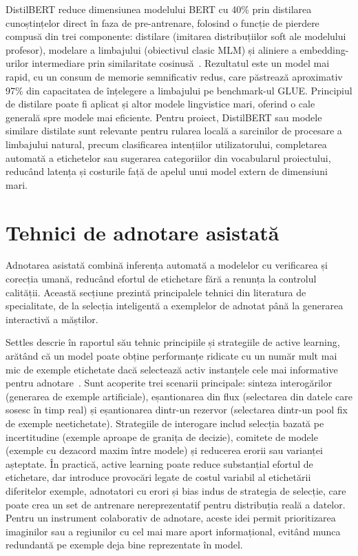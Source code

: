 DistilBERT reduce dimensiunea modelului BERT cu 40\% prin distilarea cunoștințelor direct în faza de pre-antrenare, folosind o funcție de pierdere compusă din trei componente: distilare (imitarea distribuțiilor soft ale modelului profesor), modelare a limbajului (obiectivul clasic MLM) și aliniere a embedding-urilor intermediare prin similaritate cosinusă~\cite{sanh2020distilbertdistilledversionbert}. Rezultatul este un model mai rapid, cu un consum de memorie semnificativ redus, care păstrează aproximativ 97\% din capacitatea de înțelegere a limbajului pe benchmark-ul GLUE. Principiul de distilare poate fi aplicat și altor modele lingvistice mari, oferind o cale generală spre modele mai eficiente. Pentru proiect, DistilBERT sau modele similare distilate sunt relevante pentru rularea locală a sarcinilor de procesare a limbajului natural, precum clasificarea intențiilor utilizatorului, completarea automată a etichetelor sau sugerarea categoriilor din vocabularul proiectului, reducând latența și costurile față de apelul unui model extern de dimensiuni mari.

\section{Tehnici de adnotare asistată}

Adnotarea asistată combină inferența automată a modelelor cu verificarea și corecția umană, reducând efortul de etichetare fără a renunța la controlul calității. Această secțiune prezintă principalele tehnici din literatura de specialitate, de la selecția inteligentă a exemplelor de adnotat până la generarea interactivă a măștilor.

Settles descrie în raportul său tehnic principiile și strategiile de active learning, arătând că un model poate obține performanțe ridicate cu un număr mult mai mic de exemple etichetate dacă selectează activ instanțele cele mai informative pentru adnotare~\cite{settles.tr09}. Sunt acoperite trei scenarii principale: sinteza interogărilor (generarea de exemple artificiale), eșantionarea din flux (selectarea din datele care sosesc în timp real) și eșantionarea dintr-un rezervor (selectarea dintr-un pool fix de exemple neetichetate). Strategiile de interogare includ selecția bazată pe incertitudine (exemple aproape de granița de decizie), comitete de modele (exemple cu dezacord maxim între modele) și reducerea erorii sau varianței așteptate. În practică, active learning poate reduce substanțial efortul de etichetare, dar introduce provocări legate de costul variabil al etichetării diferitelor exemple, adnotatori cu erori și bias indus de strategia de selecție, care poate crea un set de antrenare nereprezentatif pentru distribuția reală a datelor. Pentru un instrument colaborativ de adnotare, aceste idei permit prioritizarea imaginilor sau a regiunilor cu cel mai mare aport informațional, evitând munca redundantă pe exemple deja bine reprezentate în model.

